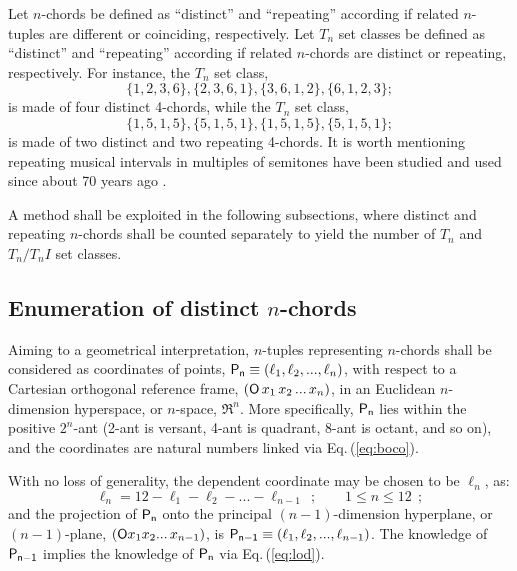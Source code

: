 \documentclass[12pt,a4paper]{article}
\begin{document}
Let $n$-chords be defined as ``distinct'' and ``repeating'' according if
related
$n$-tuples are different or coinciding, respectively.   Let $T_n$ set classes
be defined as ``distinct'' and ``repeating'' according if related $n$-chords
are distinct or repeating, respectively.   For instance, the $T_n$ set class,
\begin{displaymath}
\{1,2,3,6\},\{2,3,6,1\},\{3,6,1,2\},\{6,1,2,3\};
\end{displaymath}
is made of four distinct 4-chords, while the $T_n$ set class,
\begin{displaymath}
\{1,5,1,5\},\{5,1,5,1\},\{1,5,1,5\},\{5,1,5,1\};
\end{displaymath}
is made of two distinct and two repeating 4-chords.   It is worth
mentioning repeating musical intervals in multiples of semitones have been
studied and used since about 70 years ago \cite{Mes44}.

A method shall be exploited in the following subsections, where distinct and
repeating $n$-chords shall be counted separately to yield the number of
$T_n$ and $T_n/T_nI$ set classes.

\subsection{Enumeration of distinct $n$-chords}
\label{codi}

Aiming to a geometrical interpretation, $n$-tuples representing $n$-chords
shall be considered as coordinates of points,
${\sf P_n}\equiv(\ell_1,\ell_2,...,\ell_n)$,
with respect to a Cartesian orthogonal reference
frame, $({\sf O}\,x_1\,x_2\,...\,x_n)$, in an Euclidean $n$-dimension
hyperspace, or $n$-space, $\Re^n$.   More specifically,
${\sf P_n}$ lies within the positive $2^n$-ant (2-ant is versant, 4-ant is
quadrant, 8-ant is octant, and so on), and
the coordinates are natural numbers linked via Eq.\,(\ref{eq:boco}).

With no loss of generality, the dependent coordinate
may be chosen to be $\ell_n$, as:
\begin{equation}
\label{eq:lod}
\ell_n=12-\ell_1-\ell_2-...-\ell_{n-1}~~;\qquad1\le n\le12~~;
\end{equation}
and the projection of ${\sf P_n}$ onto the principal
$(n-1)$-dimension hyperplane, or $(n-1)$-plane,
$({\sf O}x_1x_2...\,x_{n-1})$, is ${\sf P_{n-1}}\equiv(\ell_1,
\ell_2,...,\ell_{n-1})$.   The knowledge of ${\sf P_{n-1}}$
implies the knowledge of ${\sf P_n}$ via Eq.\,(\ref{eq:lod}).
\end{document}
